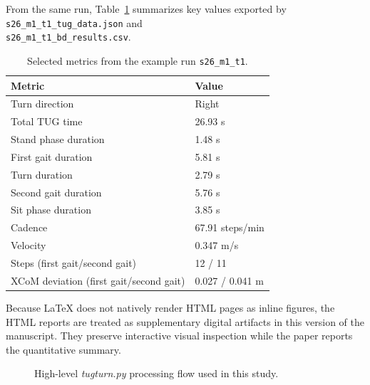 \documentclass{article}
\begin{document}
From the same run, Table~\ref{tab:example_run_metrics} summarizes key values exported by
\texttt{s26\_m1\_t1\_tug\_data.json} and\\
\texttt{s26\_m1\_t1\_bd\_results.csv}.

\begin{table}[htbp]
  \centering
  \caption{Selected metrics from the example run \texttt{s26\_m1\_t1}.}
  \label{tab:example_run_metrics}
  \begin{tabular}{ll}
    \toprule
    \textbf{Metric} & \textbf{Value} \\
    \midrule
    Turn direction & Right \\
    Total TUG time & 26.93 s \\
    Stand phase duration & 1.48 s \\
    First gait duration & 5.81 s \\
    Turn duration & 2.79 s \\
    Second gait duration & 5.76 s \\
    Sit phase duration & 3.85 s \\
    Cadence & 67.91 steps/min \\
    Velocity & 0.347 m/s \\
    Steps (first gait/second gait) & 12 / 11 \\
    XCoM deviation (first gait/second gait) & 0.027 / 0.041 m \\
    \bottomrule
  \end{tabular}
\end{table}

Because LaTeX does not natively render HTML pages as inline figures, the HTML reports are
treated as supplementary digital artifacts in this version of the manuscript. They preserve
interactive visual inspection while the paper reports the quantitative summary.

\begin{figure}[htbp]
  \centering
  \caption{High-level \textit{tugturn.py} processing flow used in this study.}
  \label{fig:pipeline}
\end{figure}
\end{document}
